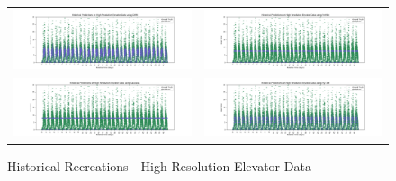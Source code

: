 \begin{figure}
  \begin{tabular}{cc}
    {\includegraphics[width = 3in]{images/results/Historical_high_res_elevator_DMM.png}} &
    {\includegraphics[width = 3in]{images/results/Historical_high_res_elevator_FreMEn.png}} \\
    {\includegraphics[width = 3in]{images/results/Historical_high_res_elevator_Gaussian.png}} &
    {\includegraphics[width = 3in]{images/results/Historical_high_res_elevator_HyT-EM.png}} \\
  \end{tabular}
  \caption{Historical Recreations - High Resolution Elevator Data}
  \label{figure:Historical_Recreations_-_High_Resolution_Elevator_Data}
\end{figure}

